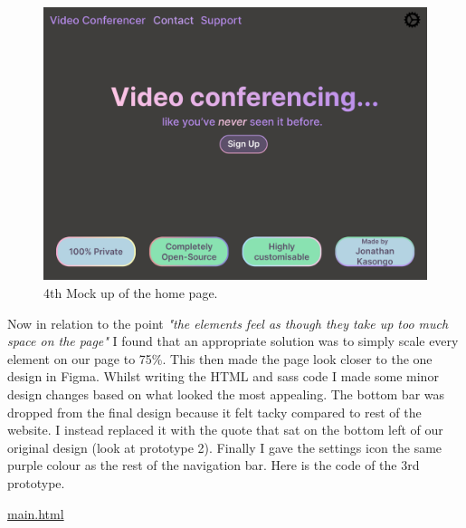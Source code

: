 \begin{figure}[H]
\centering

\includegraphics[scale=0.2]{Images/HomeUI_4.png}

\caption{4th Mock up of the home page.}
\end{figure}

Now in relation to the point \textit{"the elements feel as
though they take up too much space on the page"} I found that
an appropriate solution was to simply scale every element on
our page to 75\%. This then made the page look closer to the
one design in Figma. Whilst writing the HTML and sass code I
made some minor design changes based on what looked the most
appealing. The bottom bar was dropped from the final design
because it felt tacky compared to rest of the website. I
instead replaced it with the quote that sat on the bottom
left of our original design (look at prototype 2). Finally I
gave the settings icon the same purple colour as the rest of
the navigation bar. Here is the code of the 3rd prototype. \\
\vspace{0.2cm}

\underline{main.html}

